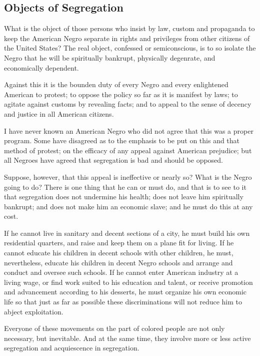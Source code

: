 \documentclass[letterpaper,10pt,english]{jupyterBook}
\begin{document}
\subsection{Objects of Segregation}
\label{\detokenize{Volumes/41/04/segregation_in_the_north:objects-of-segregation}}
\sphinxAtStartPar
What is the object of those persons who insist by law, custom and propaganda to keep the American Negro separate in rights and privileges from other citizens of the United States? The  real object, confessed or semiconscious, is to so isolate the Negro that he will be spiritually bankrupt, physically degenrate, and economically dependent.

\sphinxAtStartPar
Against this it is the bounden duty of every Negro and every enlightened American to protest; to oppose the policy so far as it is manifest by laws; to agitate against customs by revealing facts; and to appeal to the sense of decency and justice in all American citizens.

\sphinxAtStartPar
I have never known an American Negro who did not agree that this was a proper program. Some have disagreed as to the emphasis to be put on this and that method of protest; on the efficacy of any appeal against American prejudice; but all Negroes have agreed that segregation is bad and should be opposed.

\sphinxAtStartPar
Suppose, however, that this appeal is ineffective or nearly so? What is the Negro going to do? There is one thing that he can or must do, and that is to see to it that segregation does not undermine his health; does not leave him spiritually bankrupt; and does not make him an economic slave; and he must do this at any cost.

\sphinxAtStartPar
If he cannot live in sanitary and decent sections of a city, he must build his own residential quarters, and raise and keep them on a plane fit for living. If he cannot educate his children in decent schools with other children, he must, nevertheless, educate his children in decent Negro schools and arrange and conduct and oversee such schools. If he cannot enter American industry at a living wage, or find work suited to his education and talent, or receive promotion and advancement according to his desserts, he must organize his own economic life so that just as far as possible these discriminations will not reduce him to abject exploitation.

\sphinxAtStartPar
Everyone of these movements on the part of colored people are not only necessary, but inevitable. And at the same time, they involve more or less active segregation and acquiescence in segregation.
\end{document}
